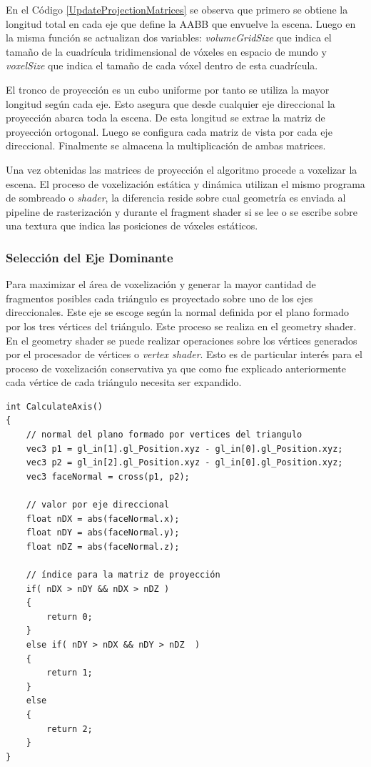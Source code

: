 En el Código \ref{UpdateProjectionMatrices} se observa que primero se obtiene la longitud total en cada eje que define la \ac{AABB} que envuelve la escena. Luego en la misma función se actualizan dos variables: \emph{volumeGridSize} que indica el tamaño de la cuadrícula tridimensional de vóxeles en espacio de mundo y \emph{voxelSize} que indica el tamaño de cada vóxel dentro de esta cuadrícula. 

El tronco de proyección es un cubo uniforme por tanto se utiliza la mayor longitud según cada eje. Esto asegura que desde cualquier eje direccional la proyección abarca toda la escena. De esta longitud se extrae la matriz de proyección ortogonal. Luego se configura cada matriz de vista por cada eje direccional. Finalmente se almacena la multiplicación de ambas matrices.

Una vez obtenidas las matrices de proyección el algoritmo procede a voxelizar la escena. El proceso de voxelización estática y dinámica utilizan el mismo programa de sombreado o \emph{shader}, la diferencia reside sobre cual geometría es enviada al pipeline de rasterización y durante el fragment shader si se lee o se escribe sobre una textura que indica las posiciones de vóxeles estáticos.

\subsubsection{Selección del Eje Dominante}
Para maximizar el área de voxelización y generar la mayor cantidad de fragmentos posibles cada triángulo es proyectado sobre uno de los ejes direccionales. Este eje se escoge según la normal definida por el plano formado por los tres vértices del triángulo. Este proceso se realiza en el geometry shader. En el geometry shader se puede realizar operaciones sobre los vértices generados por el procesador de vértices o \emph{vertex shader}. Esto es de particular interés para el proceso de voxelización conservativa ya que como fue explicado anteriormente cada vértice de cada triángulo necesita ser expandido.
\\
\begin{lstlisting}[caption={Selección del eje dominante para la proyección ortogonal.}, label=CalculateAxis]
int CalculateAxis()
{
    // normal del plano formado por vertices del triangulo
    vec3 p1 = gl_in[1].gl_Position.xyz - gl_in[0].gl_Position.xyz;
    vec3 p2 = gl_in[2].gl_Position.xyz - gl_in[0].gl_Position.xyz;
    vec3 faceNormal = cross(p1, p2);

    // valor por eje direccional
    float nDX = abs(faceNormal.x);
    float nDY = abs(faceNormal.y);
    float nDZ = abs(faceNormal.z);

    // índice para la matriz de proyección
    if( nDX > nDY && nDX > nDZ )
    {
        return 0;
    }
    else if( nDY > nDX && nDY > nDZ  )
    {
        return 1;
    }
    else
    {
        return 2;
    }
}
\end{lstlisting}


